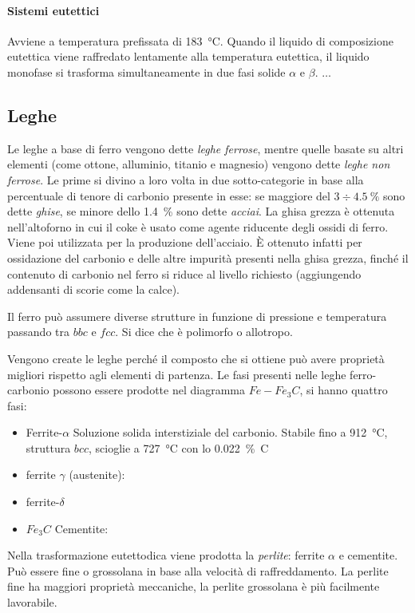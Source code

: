 \documentclass[a5paper,12pt]{article}
\newcommand{\e}{\`E\xspace}  %
\begin{document}
\paragraph{Sistemi eutettici}  Avviene a temperatura prefissata di \SI{183}{\celsius}. Quando il liquido di composizione eutettica viene raffredato lentamente alla temperatura eutettica, il liquido monofase si trasforma simultaneamente in due fasi solide $\alpha$ e $\beta$. $\dots$
\subsection{Leghe}
Le leghe a base di ferro vengono dette \emph{leghe ferrose}, mentre quelle basate su altri elementi (come ottone, alluminio, titanio e magnesio) vengono dette \emph{leghe non ferrose}. Le prime si divino a loro volta in due sotto-categorie in base alla percentuale di tenore di carbonio presente in esse: se maggiore del $3 \div \SI{4.5}{\%}$ sono dette \emph{ghise}, se minore dello \SI{1.4}{\%} sono dette \emph{acciai}. La ghisa grezza è ottenuta nell'altoforno in cui il coke è usato come agente riducente degli ossidi di ferro. Viene poi utilizzata per la produzione dell'acciaio. \e ottenuto infatti per ossidazione del carbonio e delle altre impurità presenti nella ghisa grezza, finché il contenuto di carbonio nel ferro si riduce al livello richiesto (aggiungendo addensanti di scorie come la calce).

Il ferro può assumere diverse strutture in funzione di pressione e temperatura passando tra $bbc$ e $fcc$. Si dice che è polimorfo o allotropo. 

Vengono create le leghe perché il composto che si ottiene può avere proprietà migliori rispetto agli elementi di partenza. 
Le fasi presenti nelle leghe ferro-carbonio possono essere prodotte nel diagramma $Fe-Fe_3C$, si hanno quattro fasi: 
\begin{itemize}
	\item Ferrite-$\alpha$ Soluzione solida interstiziale del carbonio. Stabile fino a \SI{912}{\celsius}, struttura $bcc$, scioglie a \SI{727}{\celsius} con lo \SI{0.022}{\% C}
	\item ferrite $\gamma$ (austenite):
	\item ferrite-$\delta$
	\item $Fe_3C$ Cementite:
\end{itemize}
Nella trasformazione eutettodica viene prodotta la \emph{perlite}: ferrite $\alpha$ e cementite. Può essere fine o grossolana in base alla velocità di raffreddamento. La perlite fine ha maggiori proprietà meccaniche, la perlite grossolana è più facilmente lavorabile.
\end{document}
